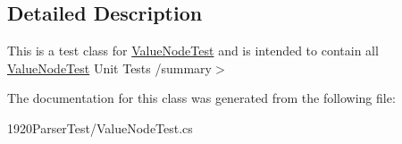 \subsection{Detailed Description}
This is a test class for \hyperlink{class__1920_parser_test_1_1_value_node_test}{Value\+Node\+Test} and is intended to contain all \hyperlink{class__1920_parser_test_1_1_value_node_test}{Value\+Node\+Test} Unit Tests /summary$>$ 

The documentation for this class was generated from the following file\+:\begin{DoxyCompactItemize}
\item 
1920\+Parser\+Test/Value\+Node\+Test.\+cs\end{DoxyCompactItemize}
